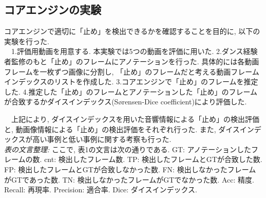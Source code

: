 \documentclass[technicalreport]{ieicej}
\begin{document}
\subsection{コアエンジンの実験}
コアエンジンで適切に「止め」を検出できるかを確認することを目的に, 以下の実験を行った. \\
　1.評価用動画を用意する. 本実験では5つの動画を評価に用いた. 2.ダンス経験者監修のもと「止め」のフレームにアノテーションを行った. 具体的には各動画フレームを一枚ずつ画像に分割し, 「止め」のフレームだと考える動画フレームインデックスのリストを作成した. 3.コアエンジンで「止め」のフレームを推定した. 4.推定した「止め」のフレームとアノテーションした「止め」のフレームが合致するかダイスインデックス(Sørensen-Dice coefficient)により評価した.\\
\begin{table}[t]
  \centering
  \caption{コアエンジン評価「止め」検出サンプル比較}
\end{table}
　上記により, ダイスインデックスを用いた音響情報による「止め」の検出評価と, 動画像情報による「止め」の検出評価をそれぞれ行った. また, ダイスインデックスが高い事例と低い事例に関する考察も行った. \\
\emph{表の文言整理: }ここで, 表1の文言は次の通りである. GT: アノテーションしたフレームの数. cnt: 検出したフレーム数. TP: 検出したフレームとGTが合致した数. FP: 検出したフレームとGTが合致しなかった数. FN: 検出しなかったフレームがGTであった数. TN: 検出しなかったフレームがGTでなかった数. Acc: 精度. Recall: 再現率. Precision: 適合率. Dice: ダイスインデックス.\\
\end{document}
